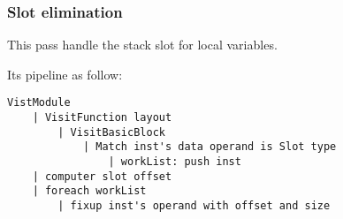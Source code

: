 \subsubsection{Slot elimination}

This pass handle the stack slot for local variables.

Its pipeline as follow:
\begin{lstlisting}[language={}]
VistModule
    | VisitFunction layout
        | VisitBasicBlock
            | Match inst's data operand is Slot type
                | workList: push inst 
    | computer slot offset
    | foreach workList
        | fixup inst's operand with offset and size
\end{lstlisting}